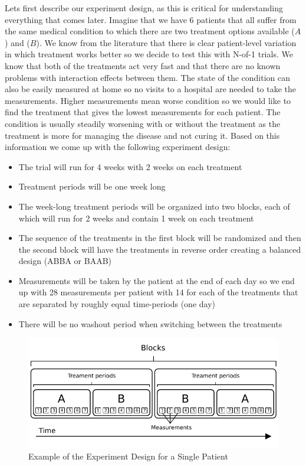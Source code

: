 \documentclass[12pt,a4paper,leqno]{report}
\theoremstyle{plain}
\theoremstyle{definition}
\theoremstyle{remark}
\begin{document}
Lets first describe our experiment design, as this is critical for understanding
everything that comes later. Imagine that we have 6 patients that all suffer from the
same medical condition to which there are two treatment options available (\(A\)) and (\(B\)). We know from the
literature that there is clear patient-level variation in which treatment works better
so we decide to test this with N-of-1 trials. We know that both of the treatments act
very fast and that there are no known problems with interaction effects between them.
The state of the condition can also be easily measured at home so no visits to
a hospital are needed to take the measurements. Higher measurements mean worse condition
so we would like to find the treatment that gives the lowest measurements for each patient. The condition is usually steadily
worsening with or without the treatment as the treatment is more for managing the
disease and not curing it. Based on this information we come up with the following experiment design:

\begin{itemize}
    \item The trial will run for 4 weeks with 2 weeks on each treatment
    \item Treatment periods will be one week long
    \item The week-long treatment periods will be organized into two blocks, each of which will run for
    2 weeks and contain 1 week on each treatment
    \item The sequence of the treatments in the first block will be randomized and then
    the second block will have the treatments in reverse order creating a balanced
    design (ABBA or BAAB)
    \item Measurements will be taken by the patient at the end of each day so we end up with
    28 measurements per patient with 14 for each of the treatments that are separated by
    roughly equal time-periods (one day)
    \item There will be no washout period when switching between the treatments
\end{itemize}

\begin{figure}[H]
    \centering
    \caption{Example of the Experiment Design for a Single Patient}
    \includegraphics{design_for_simulated_experiment.pdf}
\end{figure}
\end{document}
